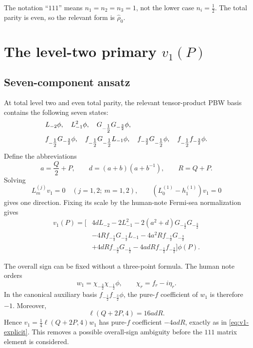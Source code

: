 \documentclass[11pt]{article}
\newcommand{\hatrho}{\widehat\rho}
\newcommand{\half}{\tfrac12}
\begin{document}
The notation ``\(111\)'' means \(n_1=n_2=n_3=1\), not the lower case
\(n_i=\half\).  The total parity is even, so the relevant form is
\(\hatrho_0\).

\section{The level-two primary \(v_1(P)\)}

\subsection{Seven-component ansatz}

At total level two and even total parity, the relevant tensor-product PBW
basis contains the following seven states:
\begin{align}
 &L_{-2}\phi,\quad L_{-1}^2\phi,\quad
 G_{-\half}G_{-\frac32}\phi,\notag\\
 &f_{-\half}G_{-\frac32}\phi,\quad
 f_{-\half}G_{-\half}L_{-1}\phi,\quad
 f_{-\frac32}G_{-\half}\phi,\quad
 f_{-\half}f_{-\frac32}\phi.
 \label{eq:seven-basis}
\end{align}
Define the abbreviations
\begin{equation}
 a=\frac Q2+P,\qquad
 d=(a+b)(a+b^{-1}),\qquad
 R=Q+P.
 \label{eq:adr}
\end{equation}
Solving
\begin{equation}
 L_m^{(j)}v_1=0\quad(j=1,2;\ m=1,2),\qquad
 (L_0^{(1)}-h_1^{(1)})v_1=0
 \label{eq:five-primary-equations}
\end{equation}
gives one direction.  Fixing its scale by the human-note Fermi-sea
normalization gives
\begin{equation}
\boxed{
\begin{aligned}
v_1(P)=\big[{}
 &4dL_{-2}-2L_{-1}^2
 -2(a^2+d)G_{-\half}G_{-\frac32}\\
 &-4R f_{-\half}G_{-\half}L_{-1}
 -4a^2R f_{-\half}G_{-\frac32}\\
 &+4dR f_{-\frac32}G_{-\half}
 -4adR f_{-\half}f_{-\frac32}
 \big]\phi(P).
\end{aligned}}
\label{eq:v1-explicit}
\end{equation}

The overall sign can be fixed without a three-point formula.  The human note
orders
\begin{equation}
 w_1=\chi_{-\frac32}\chi_{-\half}\phi,
 \qquad \chi_r=f_r-i\eta_r.
\end{equation}
In the canonical auxiliary basis \(f_{-\half}f_{-\frac32}\phi\), the
pure-\(f\) coefficient of \(w_1\) is therefore \(-1\).  Moreover,
\begin{equation}
 \ell(Q+2P,4)=16adR.
\end{equation}
Hence \(v_1=\frac14\ell(Q+2P,4)w_1\) has pure-\(f\) coefficient
\(-4adR\), exactly as in \eqref{eq:v1-explicit}.  This removes a possible
overall-sign ambiguity before the \(111\) matrix element is considered.
\end{document}
